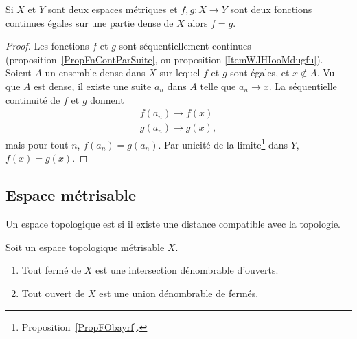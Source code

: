 \begin{proposition} \label{PropCJGIooZNpnGF}
	Si \( X\) et \( Y\) sont deux espaces métriques et \( f,g\colon X\to Y\) sont deux fonctions continues égales sur une partie dense de \( X\) alors \( f=g\).
\end{proposition}

\begin{proof}
	Les fonctions \( f\) et \( g\) sont séquentiellement continues (proposition~\ref{PropFnContParSuite}, ou proposition \ref{ItemWJHIooMdugfu}). Soient \( A\) un ensemble dense dans \( X\) sur lequel \( f\) et \( g\) sont égales, et \( x\notin A\). Vu que \( A\) est dense, il existe une suite \( a_n\) dans \( A\) telle que \( a_n\to x\). La séquentielle continuité de \( f\) et \( g\) donnent
	\begin{subequations}
		\begin{align}
			f(a_n)\to f(x) \\
			g(a_n)\to g(x),
		\end{align}
	\end{subequations}
	mais pour tout \( n\), \( f(a_n)=g(a_n)\). Par unicité de la limite\footnote{Proposition~\ref{PropFObayrf}.} dans \( Y\), \( f(x)=g(x)\).
\end{proof}

\subsection{Espace métrisable}

\begin{definition}
	Un espace topologique est  si il existe une distance compatible avec la topologie.
\end{definition}

\begin{proposition}      \label{PROPooXWBTooCvGLOj}
	Soit un espace topologique métrisable \( X\).
	\begin{enumerate}
		\item   \label{ITEMooOXVRooBsKwuq}
		      Tout fermé de \( X\) est une intersection dénombrable d'ouverts.
		\item
		      Tout ouvert de \( X\) est une union dénombrable de fermés.
	\end{enumerate}
\end{proposition}

